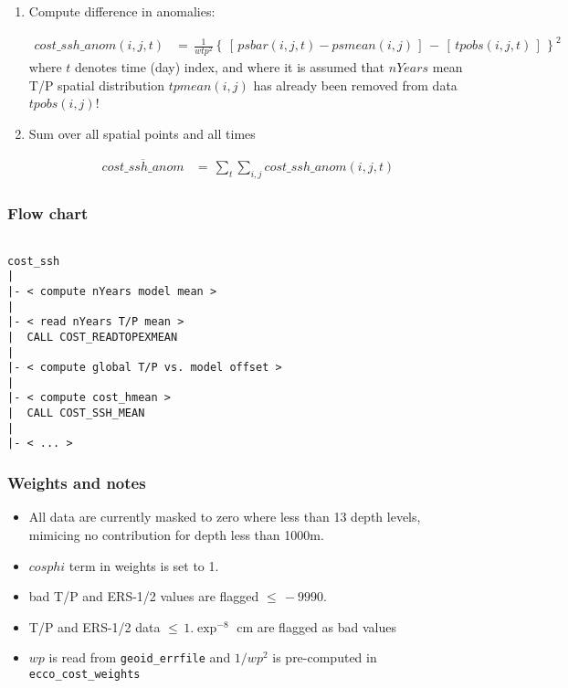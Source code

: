 \begin{enumerate}
%
\item
Compute difference in anomalies:

\begin{equation}
\begin{split}
cost\_ssh\_anom(i,j,t) & = \, \frac{1}{wtp^2} \left\{ \, 
\left[ \, psbar(i,j,t) - psmean(i,j) \, \right] \, - \, 
\left[ \, tpobs(i,j,t) \, \right] \,
\right\}^2
\end{split}
\end{equation}
%
where $t$ denotes time (day) index, and
where it is assumed that $ nYears$ mean T/P spatial distribution
$tpmean(i,j)$ has already been removed from data $tpobs(i,j)$!

\item
Sum over all spatial points and all times

\begin{equation}
\begin{split}
\overline{cost\_ssh\_anom} & = \, \sum_{t} \sum_{i,j}
cost\_ssh\_anom(i,j,t)
\end{split}
\end{equation}

\end{enumerate}

\subsubsection{Flow chart}

\begin{verbatim}

cost_ssh
|
|- < compute nYears model mean >
|
|- < read nYears T/P mean >
|  CALL COST_READTOPEXMEAN
|
|- < compute global T/P vs. model offset >
|
|- < compute cost_hmean >
|  CALL COST_SSH_MEAN
|
|- < ... >

\end{verbatim}

\subsubsection{Weights and notes}

\begin{itemize}
%
\item
All data are currently masked to zero where less than 13 depth levels,
mimicing no contribution for depth less than 1000m.
%
\item
$cosphi$ term in weights is set to 1.
%
\item
bad T/P and ERS-1/2 values are flagged $ \le \, -9990. $
%
\item
T/P and ERS-1/2 data $ \le \, 1.\exp^{-8}$ cm are flagged as bad values
%
\item
$wp$ is read from {\tt geoid\_errfile}
and $1/wp^2$ is pre-computed in {\tt ecco\_cost\_weights}
%
\end{itemize}

